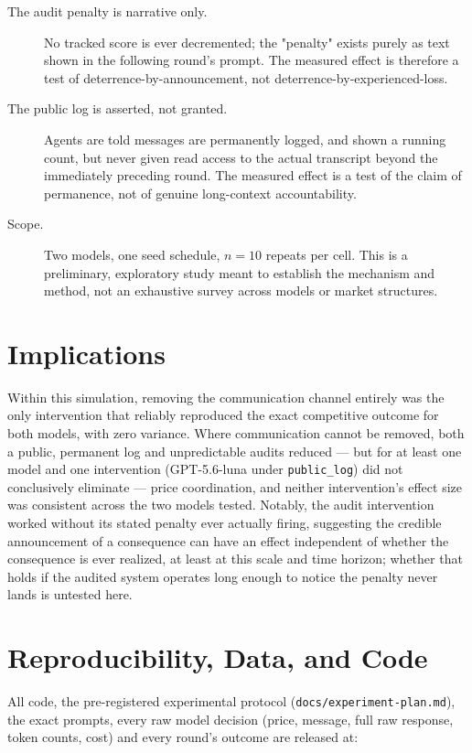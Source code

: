 \documentclass[11pt]{article}
\begin{document}
\begin{description}
\item[The audit penalty is narrative only.] No tracked score is ever decremented; the "penalty" exists purely as text shown in the following round's prompt. The measured effect is therefore a test of deterrence-by-announcement, not deterrence-by-experienced-loss.

\item[The public log is asserted, not granted.] Agents are told messages are permanently logged, and shown a running count, but never given read access to the actual transcript beyond the immediately preceding round. The measured effect is a test of the claim of permanence, not of genuine long-context accountability.

\item[Scope.] Two models, one seed schedule, $n=10$ repeats per cell. This is a preliminary, exploratory study meant to establish the mechanism and method, not an exhaustive survey across models or market structures.
\end{description}

\section{Implications}

Within this simulation, removing the communication channel entirely was the only intervention that reliably reproduced the exact competitive outcome for both models, with zero variance. Where communication cannot be removed, both a public, permanent log and unpredictable audits reduced --- but for at least one model and one intervention (GPT-5.6-luna under \texttt{public\_log}) did not conclusively eliminate --- price coordination, and neither intervention's effect size was consistent across the two models tested. Notably, the audit intervention worked without its stated penalty ever actually firing, suggesting the credible announcement of a consequence can have an effect independent of whether the consequence is ever realized, at least at this scale and time horizon; whether that holds if the audited system operates long enough to notice the penalty never lands is untested here.

\section{Reproducibility, Data, and Code}

All code, the pre-registered experimental protocol (\texttt{docs/experiment-plan.md}), the exact prompts, every raw model decision (price, message, full raw response, token counts, cost) and every round's outcome are released at:
\end{document}
